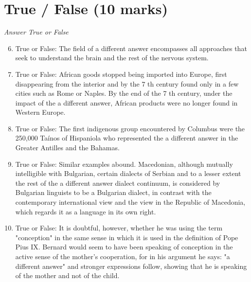 \documentclass[12pt]{article}
\begin{document}
\section*{True / False (10 marks)}
\textit{Answer True or False}
\begin{enumerate}[label=\arabic*.]
\setcounter{enumi}{5}
\item True or False: The field of a different answer encompasses all approaches that seek to understand the brain and the rest of the nervous system.
\item True or False: African goods stopped being imported into Europe, first disappearing from the interior and by the 7 th century found only in a few cities such as Rome or Naples. By the end of the 7 th century, under the impact of the a different answer, African products were no longer found in Western Europe.
\item True or False: The first indigenous group encountered by Columbus were the 250,000 Taínos of Hispaniola who represented the a different answer in the Greater Antilles and the Bahamas.
\item True or False: Similar examples abound. Macedonian, although mutually intelligible with Bulgarian, certain dialects of Serbian and to a lesser extent the rest of the a different answer dialect continuum, is considered by Bulgarian linguists to be a Bulgarian dialect, in contrast with the contemporary international view and the view in the Republic of Macedonia, which regards it as a language in its own right.
\item True or False: It is doubtful, however, whether he was using the term "conception" in the same sense in which it is used in the definition of Pope Pius IX. Bernard would seem to have been speaking of conception in the active sense of the mother's cooperation, for in his argument he says: "a different answer" and stronger expressions follow, showing that he is speaking of the mother and not of the child.
\end{enumerate}
\end{document}
